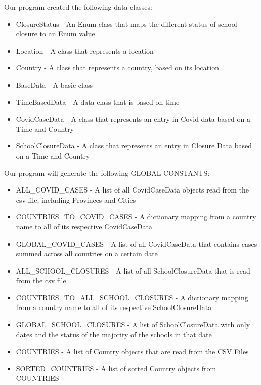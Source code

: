 \documentclass[fontsize=11pt]{article}
\begin{document}
    Our program created the following data classes:

    \begin{itemize}
        \item ClosureStatus - An Enum class that maps the different status of school closure to an Enum value
        \item Location - A class that represents a location
        \item Country - A class that represents a country, based on its location
        \item BaseData - A basic class
        \item TimeBasedData - A data class that is based on time
        \item CovidCaseData - A class that represents an entry in Covid data based on a Time and Country
        \item SchoolClosureData - A class that represents an entry in Closure Data based on a Time and Country
    \end{itemize}

    Our program will generate the following GLOBAL CONSTANTS:

    \begin{itemize}
        \item ALL\_COVID\_CASES - A list of all CovidCaseData objects read from the csv file, including Provinces and Cities
        \item COUNTRIES\_TO\_COVID\_CASES - A dictionary mapping from a country name to all of its respective CovidCaseData
        \item GLOBAL\_COVID\_CASES - A list of all CovidCaseData that contains cases summed across all countries on a certain date
        \item ALL\_SCHOOL\_CLOSURES - A list of all SchoolClosureData that is read from the csv file
        \item COUNTRIES\_TO\_ALL\_SCHOOL\_CLOSURES - A dictionary mapping from a country name to all of its respective SchoolClosureData
        \item GLOBAL\_SCHOOL\_CLOSURES - A list of SchoolClosureData with only dates and the status of the majority of the schools in that date
        \item COUNTRIES - A list of Country objects that are read from the CSV Files
        \item SORTED\_COUNTRIES - A list of sorted Country objects from COUNTRIES
    \end{itemize}
\end{document}
